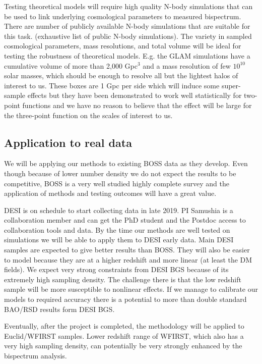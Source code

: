 Testing theoretical models will require high quality N-body simulations that
can be used to link underlying cosmological parameters to measured bispectrum.
There are number of publicly available N-body simulations that are suitable for
this task. (exhaustive list of public N-body simulations). The variety in
sampled cosmological parameters, mass resolutions, and total volume will be
ideal for testing the robustness of theoretical models.  E.g. the GLAM
simulations have a cumulative volume of more than 2,000 Gpc$^3$ and a mass
resolution of few $10^{10}$ solar masses, which should be enough to resolve
all but the lightest halos of interest to us. These boxes are 1 Gpc per side
which will induce some super-sample effects but they have been demonstrated to
work well statistically for two-point functions and we have no reason to
believe that the effect will be large for the three-point function on the
scales of interest to us.

\subsection*{Application to real data}

We will be applying our methods to existing BOSS data as they develop. Even
though because of lower number density we do not expect the results to be
competitive, BOSS is a very well studied highly complete survey and the
application of methods and testing outcomes will have a great value. 

DESI is on schedule to start collecting data in late 2019. PI Samushia is a
collaboration member and can get the PhD student and the Postdoc access to
collaboration tools and data. By the time our methods are well tested on
simulations we will be able to apply them to DESI early data. Main DESI samples
are expected to give better results than BOSS. They will also be easier to
model because they are at a higher redshift and more linear (at least the DM
fields). We expect very strong constraints from DESI BGS because of its
extremely high sampling density. The challenge there is that the low redshift
sample will be more susceptible to nonlinear effects. If we manage to calibrate
our models to required accuracy there is a potential to more than double
standard BAO/RSD results form DESI BGS.

Eventually, after the project is completed, the methodology will be applied to
Euclid/WFIRST samples. Lower redshift range of WFIRST, which also has a very
high sampling density, can potentially be very strongly enhanced by the
bispectrum analysis.

